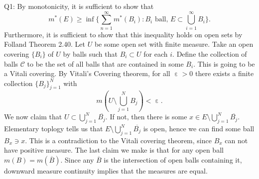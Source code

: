 \documentclass[letterpaper]{article}
\DeclareMathOperator{\ep}{\varepsilon}
\newcommand{\ol}{\overline}
\begin{document}
\noindent Q1: By monotonicity, it is sufficient to show that $$m^\ast(E) \geq \inf \Big\{ \sum_{n=1}^\infty m^\ast(B_i) : \text{$B_i$ ball, } E \subset \bigcup_{i=1}^\infty B_i  \Big\}. $$ 
Furthermore, it is sufficient to show that this inequality holds on open sets by Folland Theorem 2.40. Let $U$ be some open set with finite measure. Take an open covering $\{B_i\} $ of $U$ by balls such that $B_i \subset U$ for each $i$.
Define the collection of balls $\mathcal{C}$ to be the set of all balls that are contained in some $B_i$. This is going to be a Vitali covering. By Vitali's Covering theorem, for all $\ep>0$ there exists a finite collection $\{B_j\}_{j=1}^N$ with $$m(U \setminus \bigcup_{j=1}^N B_j) < \ep. $$ 
We now claim that $U \subset \bigcup_{j=1}^N \ol{B_j}$. If not, then there is some $x\in E \setminus \bigcup_{j=1}^N \ol{B_j}$. Elementary toplogy tells us that $E \setminus \bigcup_{j=1}^N \ol{B_j}$ is open, hence we can find some ball $B_x \ni x$. This is a contradiction to the Vitali covering theorem, since $B_x$ can not have positive measure. 
The last claim we make is that for any open ball $m(B) = m(\ol{B}).$ Since any $\ol{B}$ is the intersection of open balls containing it, downward measure continuity implies that the measures are equal. 
\end{document}
